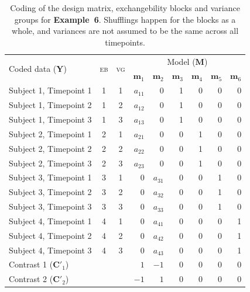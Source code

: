 \begin{table}[!t]
\caption[Coding for Example 6]{Coding of the design matrix, exchangebility blocks and variance groups for \textbf{Example~6}. Shufflings happen for the blocks as a whole, and variances are not assumed to be the same across all timepoints.}
\begin{center}
{\small
\begin{tabular}{@{}lccrrrrrr@{}}
\toprule
\multirow{2}{*}{\vspace*{-1.7mm}Coded data ($\mathbf{Y}$)} & \multirow{2}{*}{\vspace*{-1.7mm}\textsc{eb}} & \multirow{2}{*}{\vspace*{-1.7mm}\textsc{vg}} & \multicolumn{6}{c}{Model ($\mathbf{M}$)\hspace*{-6mm}}\\
\cmidrule(l){4-9}
& & & $\mathbf{m}_1$ & $\mathbf{m}_2$ & $\mathbf{m}_3$ & $\mathbf{m}_4$ & $\mathbf{m}_5$ & $\mathbf{m}_6$\\
\midrule
Subject 1, Timepoint 1 & 1 & 1 & $a_{11}$ & 0 & 1 & 0 & 0 & 0\\
Subject 1, Timepoint 2 & 1 & 2 & $a_{12}$ & 0 & 1 & 0 & 0 & 0\\
Subject 1, Timepoint 3 & 1 & 3 & $a_{13}$ & 0 & 1 & 0 & 0 & 0\\
Subject 2, Timepoint 1 & 2 & 1 & $a_{21}$ & 0 & 0 & 1 & 0 & 0\\
Subject 2, Timepoint 2 & 2 & 2 & $a_{22}$ & 0 & 0 & 1 & 0 & 0\\
Subject 2, Timepoint 3 & 2 & 3 & $a_{23}$ & 0 & 0 & 1 & 0 & 0\\
Subject 3, Timepoint 1 & 3 & 1 & 0 & $a_{31}$ & 0 & 0 & 1 & 0\\
Subject 3, Timepoint 2 & 3 & 2 & 0 & $a_{32}$ & 0 & 0 & 1 & 0\\
Subject 3, Timepoint 3 & 3 & 3 & 0 & $a_{33}$ & 0 & 0 & 1 & 0\\
Subject 4, Timepoint 1 & 4 & 1 & 0 & $a_{41}$ & 0 & 0 & 0 & 1\\
Subject 4, Timepoint 2 & 4 & 2 & 0 & $a_{42}$ & 0 & 0 & 0 & 1\\
Subject 4, Timepoint 3 & 4 & 3 & 0 & $a_{43}$ & 0 & 0 & 0 & 1\\
\midrule
Contrast 1 ($\mathbf{C}'_1$) & & & $1$ & $-1$ & 0 & 0 & 0 & 0\\
Contrast 2 ($\mathbf{C}'_2$) & & & $-1$ & $1$ & 0 & 0 & 0 & 0\\
\bottomrule
\end{tabular}}
\end{center}
\label{tab:perm:ex_longitudinal}
\end{table}

